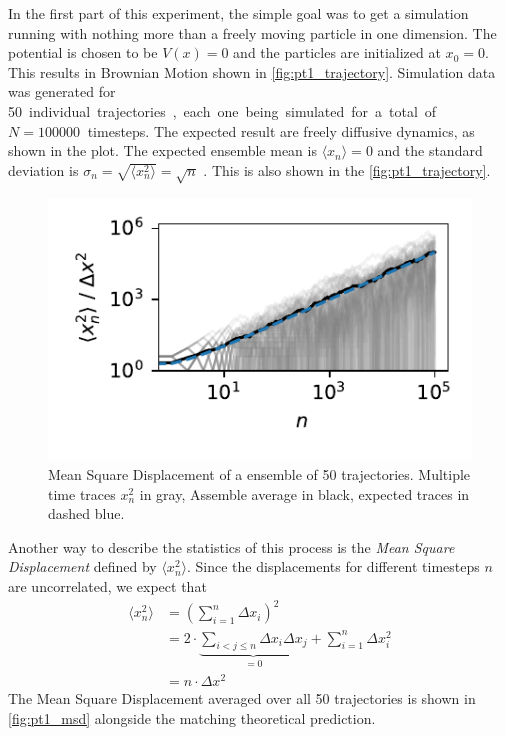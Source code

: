\documentclass[
    parskip=half, 
    twoside=false,
    twocolumn=true,
    fontsize=11pt,
]{scrarticle}
\begin{document}

In the first part of this experiment, the simple goal was to get a simulation running with nothing more than a freely moving particle in one dimension. 
The potential is chosen to be $V(x)=0$ and the particles are initialized at $x_0=0$.
This results in Brownian Motion shown in \autoref{fig:pt1_trajectory}. Simulation data was generated for \SI{50} individual trajectories, each one being simulated for a total of $N=\SI{100000}{}$ timesteps. The expected result are freely diffusive dynamics, as shown in the plot.
The expected ensemble mean is $\langle x_n\rangle = 0$ and the standard deviation is $\sigma_n = \sqrt{\langle x_n^2 \rangle} = \sqrt{n}$ \autocite{noauthor_wiener_2025}.
This is also shown in the \autoref{fig:pt1_trajectory}.

\begin{figure}
    \centering
    \includegraphics{figures/01 msd.pdf}
    \caption{
        Mean Square Displacement of a ensemble of 50 trajectories.
        Multiple time traces $x_n^2$ in gray, Assemble average in black, expected traces in dashed blue.
    }
    \label{fig:pt1_msd}
\end{figure}
Another way to describe the statistics of this process is the \textit{Mean Square Displacement} defined by $\langle x_n^2 \rangle$.
Since the displacements for different timesteps $n$ are uncorrelated, we expect that
\begin{align*}
    \langle x_n^2 \rangle 
    &= \left(\sum_{i=1}^n \Delta x_i\right)^2 \\
    &= 2 \cdot \underbrace{\sum_{i<j\leq n} \Delta x_i \Delta x_j}_{=0} + \sum_{i=1}^n \Delta x_i^2 \\ 
    &= n \cdot \Delta x^2
\end{align*}
The Mean Square Displacement averaged over all \SI{50}{} trajectories is shown in \autoref{fig:pt1_msd} alongside the matching theoretical prediction.
\end{document}
